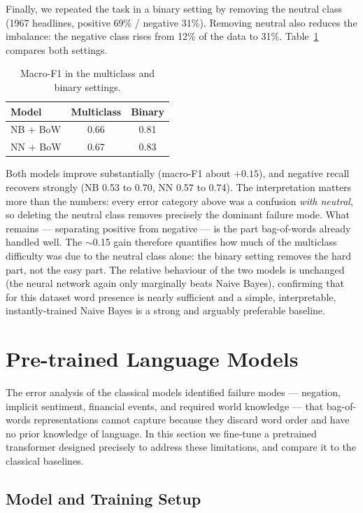 \documentclass[sigconf,nonacm]{acmart}
\begin{document}
Finally, we repeated the task in a binary setting by removing the neutral class (1967 headlines, positive 69\% / negative 31\%). Removing neutral also reduces the imbalance: the negative class rises from 12\% of the data to 31\%. Table~\ref{tab:binary} compares both settings.

\begin{table}[t]
\centering
\caption{Macro-F1 in the multiclass and binary settings.}
\label{tab:binary}
\begin{tabular}{lcc}
\toprule
Model & Multiclass & Binary \\
\midrule
NB + BoW & 0.66 & 0.81 \\
NN + BoW & 0.67 & 0.83 \\
\bottomrule
\end{tabular}
\end{table}

Both models improve substantially (macro-F1 about $+0.15$), and negative recall recovers strongly (NB 0.53 to 0.70, NN 0.57 to 0.74). The interpretation matters more than the numbers: every error category above was a confusion \emph{with neutral}, so deleting the neutral class removes precisely the dominant failure mode. What remains --- separating positive from negative --- is the part bag-of-words already handled well. The $\sim$0.15 gain therefore quantifies how much of the multiclass difficulty was due to the neutral class alone: the binary setting removes the hard part, not the easy part. The relative behaviour of the two models is unchanged (the neural network again only marginally beats Naive Bayes), confirming that for this dataset word presence is nearly sufficient and a simple, interpretable, instantly-trained Naive Bayes is a strong and arguably preferable baseline.

\section{Pre-trained Language Models}
\label{sec:transformers}

The error analysis of the classical models identified failure modes --- negation, implicit sentiment, financial events, and required world knowledge --- that bag-of-words representations cannot capture because they discard word order and have no prior knowledge of language. In this section we fine-tune a pretrained transformer designed precisely to address these limitations, and compare it to the classical baselines.

\subsection{Model and Training Setup}
\end{document}
